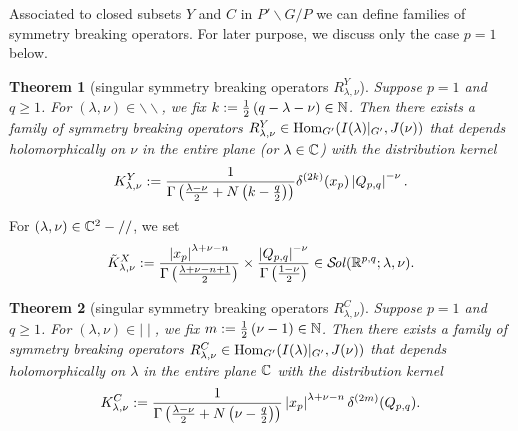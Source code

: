 \documentclass[reqno,12pt]{pja00} %
\newtheorem{theorem}{Theorem}[section]
\newcommand{\sol}{\mathcal{S}\!{\it ol}(\R^{p,q};\lambda,\nu)}
\newcommand{\Hom}{\mbox{\normalfont Hom}}
\theoremstyle{definition}
\theoremstyle{exampstyle} \newtheorem{examp}[theorem]{Theorem}
\renewcommand{\Q}{Q_{p,q}}
\renewcommand{\setminus}{-}
\begin{document}
Associated to closed subsets $Y$ and $C$ in $P'\backslash G/P$ we can define families of symmetry breaking operators. For later purpose, we discuss only the case $p=1$ below.
\begin{theorem}[singular symmetry breaking operators $R_{\lambda,\nu}^Y$]
	Suppose $p=1$ and $q\ge1$. For $(\lambda,\nu)\in\backslash\backslash$, we fix $k:=\frac{1}{2}\left( q-\lambda-\nu \right)\in\mathbb{N}$. Then there exists a family of symmetry breaking operators
	$R_{\lambda,\nu}^Y\in\Hom_{G'}(I(\lambda)\kern-0.1cm\mid_{G'},J(\nu))$ that depends holomorphically on $\nu$ in the entire plane (or $\lambda\in\mathbb{C}$) with the distribution kernel\begin{equation*}
		K_{\lambda,\nu}^Y:=\frac{1}{\Gamma\left( \frac{\lambda-\nu}{2}+N\left( k-\frac{q}{2} \right) \right)}\delta^{(2k)}(x_p)\myabs{\Q}^{-\nu}.
	\end{equation*}
\end{theorem}
For $(\lambda,\nu)\in\C^2\setminus//$, we set 
\[\tilde{K}_{\lambda,\nu}^X:=\frac{\myabs{x_p}^{\lambda+\nu-n}}{\Gamma\left( \frac{\lambda+\nu-n+1}{2} \right)}\times
\frac{\myabs{\Q}^{-\nu}}{\Gamma\left( \frac{1-\nu}{2} \right)}\in\sol.\]
\begin{theorem}[singular symmetry breaking operators $R_{\lambda,\nu}^C$]
	Suppose $p=1$ and $q\ge1$. For $(\lambda,\nu)\in\mid\mid$, we fix $m:=\frac{1}{2}\left(\nu-1 \right)\in\mathbb{N}$. Then there exists a family of symmetry breaking operators
	$R_{\lambda,\nu}^C\in\Hom_{G'}(I(\lambda)\kern-0.1cm\mid_{G'},J(\nu))$ that depends holomorphically on $\lambda$ in the entire plane $\mathbb{C}$ with the distribution kernel\begin{equation*}
		K_{\lambda,\nu}^C:=\frac{1}{\Gamma\left( \frac{\lambda-\nu}{2}+N\left(\nu- \frac{q}{2} \right) \right)}\myabs{x_p}^{\lambda+\nu-n}\delta^{(2m)}(\Q).
	\end{equation*}
\end{theorem}
\end{document}
